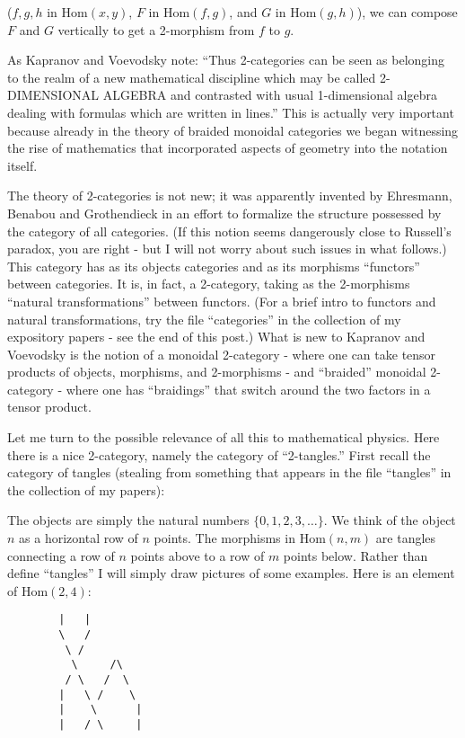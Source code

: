 \documentclass{article}
\begin{document}
(\(f,g,h\) in \(\mathrm{Hom}(x,y)\), \(F\) in \(\mathrm{Hom}(f,g)\), and
\(G\) in \(\mathrm{Hom}(g,h)\)), we can compose \(F\) and \(G\)
vertically to get a 2-morphism from \(f\) to \(g\).

As Kapranov and Voevodsky note: ``Thus 2-categories can be seen as
belonging to the realm of a new mathematical discipline which may be
called 2-DIMENSIONAL ALGEBRA and contrasted with usual 1-dimensional
algebra dealing with formulas which are written in lines.'' This is
actually very important because already in the theory of braided
monoidal categories we began witnessing the rise of mathematics that
incorporated aspects of geometry into the notation itself.

The theory of 2-categories is not new; it was apparently invented by
Ehresmann, Benabou and Grothendieck in an effort to formalize the
structure possessed by the category of all categories. (If this notion
seems dangerously close to Russell's paradox, you are right - but I will
not worry about such issues in what follows.) This category has as its
objects categories and as its morphisms ``functors'' between categories.
It is, in fact, a 2-category, taking as the 2-morphisms ``natural
transformations'' between functors. (For a brief intro to functors and
natural transformations, try the file ``categories'' in the collection
of my expository papers - see the end of this post.) What is new to
Kapranov and Voevodsky is the notion of a monoidal 2-category - where
one can take tensor products of objects, morphisms, and 2-morphisms -
and ``braided'' monoidal 2-category - where one has ``braidings'' that
switch around the two factors in a tensor product.

Let me turn to the possible relevance of all this to mathematical
physics. Here there is a nice 2-category, namely the category of
``2-tangles.'' First recall the category of tangles (stealing from
something that appears in the file ``tangles'' in the collection of my
papers):

The objects are simply the natural numbers \(\{0,1,2,3,\ldots\}\). We
think of the object \(n\) as a horizontal row of \(n\) points. The
morphisms in \(\mathrm{Hom}(n,m)\) are tangles connecting a row of \(n\)
points above to a row of \(m\) points below. Rather than define
``tangles'' I will simply draw pictures of some examples. Here is an
element of \(\mathrm{Hom}(2,4)\):

\begin{verbatim}
        |   |
        \   /
         \ /
          \     /\
         / \   /  \
        |   \ /    \
        |    \      |
        |   / \     |
\end{verbatim}
\end{document}
